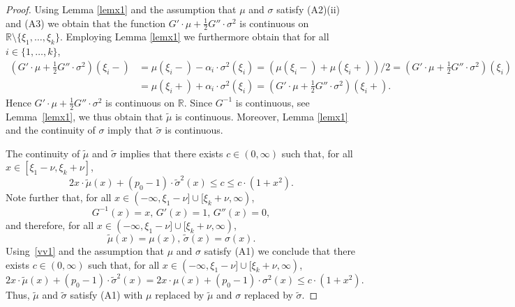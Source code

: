 \documentclass[11pt]{amsart}
\newcommand{\R}{{\mathbb R}}
\theoremstyle{plain}
\theoremstyle{definition}
\begin{document}
\begin{proof} Using Lemma \ref{lemx1} and the assumption that  $\mu$ and $\sigma$ satisfy (A2)(ii) and (A3) we obtain that the function $G'\cdot \mu+\tfrac{1}{2}G''\cdot\sigma^2$ is continuous on $\R\setminus\{\xi_1,\dots,\xi_k\}$. Employing Lemma \ref{lemx1} we furthermore obtain
 that for all $i\in\{1, \ldots, k\}$,
\begin{align*}
(G'\cdot \mu +\tfrac{1}{2}G''\cdot\sigma^2)(\xi_i-) & = \mu(\xi_i-) -\alpha_i\cdot \sigma^2(\xi_i)
 = (\mu(\xi_i-) +\mu(\xi_i+))/2  = (G'\cdot \mu +\tfrac{1}{2}G''\cdot\sigma^2)(\xi_i)\\
& = \mu(\xi_i+) +\alpha_i\cdot \sigma^2(\xi_i) =  (G'\cdot \mu+\tfrac{1}{2}G''\cdot\sigma^2)(\xi_i+).
\end{align*}
Hence $G'\cdot \mu+\tfrac{1}{2}G''\cdot\sigma^2$ is continuous on $\R$. Since $G^{-1}$ is continuous, see  Lemma~\ref{lemx1}, we thus obtain that $\widetilde\mu$ is continuous. Moreover,  Lemma \ref{lemx1} and the continuity of $\sigma$ imply that $\widetilde\sigma$ is continuous.

The continuity of $\widetilde\mu$ and $\widetilde\sigma$ implies that there exists  $c\in(0, \infty)$  such that, for all $x\in[\xi_1-\nu, \xi_k+\nu]$,
 \[
 2x \cdot \widetilde\mu(x)+(p_0-1)\cdot \widetilde\sigma^2(x)\leq c\leq c\cdot (1+x^2).
 \]
Note further that, for all $x\in(-\infty, \xi_1-\nu]\cup [\xi_k+\nu, \infty)$,
\begin{equation}\label{e1}
 G^{-1}(x)=x, \, G'(x)=1, \, G''(x)=0,
\end{equation}
and therefore, for all $x\in(-\infty, \xi_1-\nu]\cup [\xi_k+\nu, \infty)$,
\begin{equation}\label{vv1}
\widetilde\mu(x)=\mu(x), \, \widetilde\sigma(x)=\sigma(x).
\end{equation}
Using~\eqref{vv1} and the assumption that  $\mu$ and $\sigma$ satisfy (A1) we conclude that
 there exists  $c\in(0, \infty)$  such that, for all  $x\in(-\infty, \xi_1-\nu]\cup [\xi_k+\nu, \infty)$,
 \[
 2x \cdot \widetilde\mu(x)+(p_0-1)\cdot \widetilde\sigma^2(x)=2x \cdot \mu(x)+(p_0-1)\cdot \sigma^2(x)\leq c\cdot (1+x^2).
 \]
Thus, $\widetilde \mu$ and $\widetilde \sigma$ satisfy (A1) with $\mu$ replaced by $\widetilde \mu$ and $\sigma$ replaced by $\widetilde \sigma$.


\end{proof}
\end{document}
